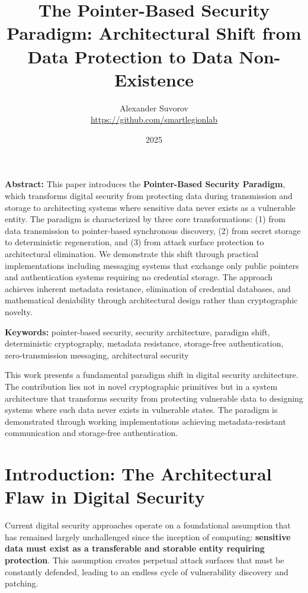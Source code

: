 \documentclass[11pt,a4paper]{article}
\title{The Pointer-Based Security Paradigm: Architectural Shift from Data Protection to Data Non-Existence}
\author{Alexander Suvorov \\ \url{https://github.com/smartlegionlab}}
\date{2025}
\begin{document}
\maketitle

\begin{summarybox}
\textbf{Abstract:} This paper introduces the \textbf{Pointer-Based Security Paradigm}, which transforms digital security from protecting data during transmission and storage to architecting systems where sensitive data never exists as a vulnerable entity. The paradigm is characterized by three core transformations: (1) from data transmission to pointer-based synchronous discovery, (2) from secret storage to deterministic regeneration, and (3) from attack surface protection to architectural elimination. We demonstrate this shift through practical implementations including messaging systems that exchange only public pointers and authentication systems requiring no credential storage. The approach achieves inherent metadata resistance, elimination of credential databases, and mathematical deniability through architectural design rather than cryptographic novelty.
\end{summarybox}

\textbf{Keywords:} pointer-based security, security architecture, paradigm shift, deterministic cryptography, metadata resistance, storage-free authentication, zero-transmission messaging, architectural security

\begin{importantbox}
This work presents a fundamental paradigm shift in digital security architecture. The contribution lies not in novel cryptographic primitives but in a system architecture that transforms security from protecting vulnerable data to designing systems where such data never exists in vulnerable states. The paradigm is demonstrated through working implementations achieving metadata-resistant communication and storage-free authentication.
\end{importantbox}

\section{Introduction: The Architectural Flaw in Digital Security}

Current digital security approaches operate on a foundational assumption that has remained largely unchallenged since the inception of computing: \textbf{sensitive data must exist as a transferable and storable entity requiring protection}. This assumption creates perpetual attack surfaces that must be constantly defended, leading to an endless cycle of vulnerability discovery and patching.
\end{document}
